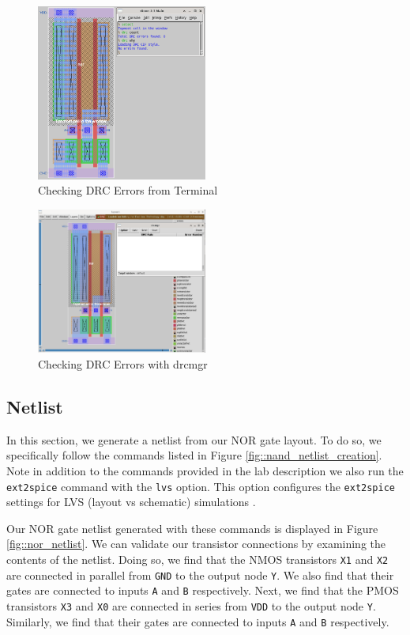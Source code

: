 \documentclass{article}
\begin{document}
	\begin{figure}[H]
		\centerline{\includegraphics[width=0.5\textwidth]{nor_drc_errors_terminal.png}}
		\caption{Checking DRC Errors from Terminal}
		\label{fig::nor_drc_errors_terminal}
	\end{figure}
	
	\begin{figure}[H]
		\centerline{\includegraphics[width=0.5\textwidth]{nor_drc_errors_drcmgr.png}}
		\caption{Checking DRC Errors with drcmgr}
		\label{fig::nor_drc_errors_drcmgr}
	\end{figure}
	
	\subsection{Netlist}
	
	In this section, we generate a netlist from our NOR gate layout. To do so, we specifically follow the commands listed in Figure \ref{fig::nand_netlist_creation}. Note in addition to the commands provided in the lab description we also run the \texttt{ext2spice} command with the \texttt{lvs} option. This option configures the \texttt{ext2spice} settings for LVS (layout vs schematic) simulations \cite{a2021_magic83}.
	
	Our NOR gate netlist generated with these commands is displayed in Figure \ref{fig::nor_netlist}. We can validate our transistor connections by examining the contents of the netlist. Doing so, we find that the NMOS transistors \texttt{X1} and \texttt{X2} are connected in parallel from \texttt{GND} to the output node \texttt{Y}. We also find that their gates are connected to inputs \texttt{A} and \texttt{B} respectively. Next, we find that the PMOS transistors \texttt{X3} and \texttt{X0} are connected in series from \texttt{VDD} to the output node \texttt{Y}. Similarly, we find that their gates are connected to inputs \texttt{A} and \texttt{B} respectively.
	
\end{document}

